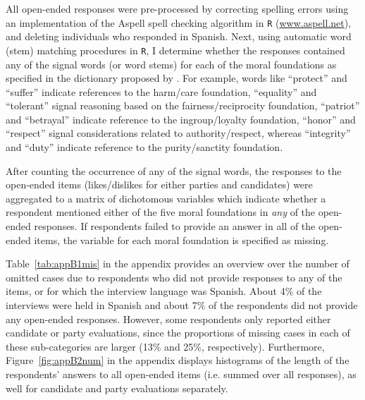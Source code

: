 \documentclass[12pt]{article}
\begin{document}
All open-ended responses were pre-processed by correcting spelling errors using an implementation of the Aspell spell checking algorithm in \texttt{R} (\url{www.aspell.net}), and deleting individuals who responded in Spanish. Next, using automatic word (stem) matching procedures in \texttt{R}, I determine whether the responses contained any of the signal words (or word stems) for each of the moral foundations as specified in the dictionary proposed by \citet[][the word lists are also presented in Appendix~\ref{app:oview}]{graham2009liberals}. For example, words like ``protect'' and ``suffer'' indicate references to the harm/care foundation, ``equality'' and ``tolerant'' signal reasoning based on the fairness/reciprocity foundation, ``patriot'' and ``betrayal'' indicate reference to the ingroup/loyalty foundation, ``honor'' and ``respect'' signal considerations related to authority/respect, whereas ``integrity'' and ``duty'' indicate reference to the purity/sanctity foundation.

After counting the occurrence of any of the signal words, the responses to the open-ended items (likes/dislikes for either parties and candidates) were aggregated to a matrix of dichotomous variables which indicate whether a respondent mentioned either of the five moral foundations in \textit{any} of the open-ended responses. If respondents failed to provide an answer in all of the open-ended items, the variable for each moral foundation is specified as missing.

Table~\ref{tab:appB1mis} in the appendix provides an overview over the number of omitted cases due to respondents who did not provide responses to any of the items, or for which the interview language was Spanish. About 4\% of the interviews were held in Spanish and about 7\% of the respondents did not provide any open-ended responses. However, some respondents only reported either candidate or party evaluations, since the proportions of missing cases in each of these sub-categories are larger (13\% and 25\%, respectively). Furthermore, Figure~\ref{fig:appB2num} in the appendix displays histograms of the length of the respondents' answers to all open-ended items (i.e. summed over all responses), as well for candidate and party evaluations separately.
\end{document}
